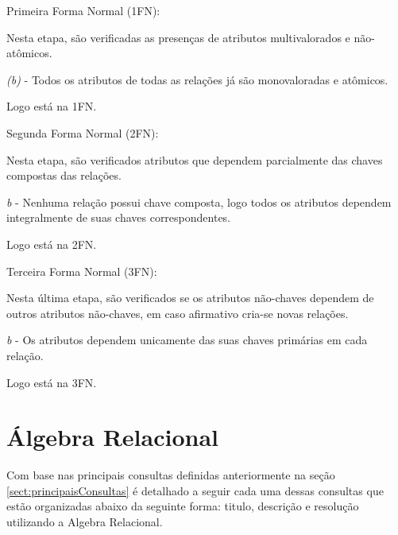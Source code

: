 \documentclass[12pt, onecolumn, titlepage]{article}
\begin{document}
\begin{description}

\item Primeira Forma Normal (1FN):

Nesta etapa, são verificadas as presenças de atributos multivalorados e não-atômicos.

\textit{(b)} - Todos os atributos de todas as relações já são monovaloradas e atômicos.

Logo está na 1FN.

\item Segunda Forma Normal (2FN):

Nesta etapa, são verificados atributos que dependem parcialmente das chaves compostas das relações.

\textit{b} - Nenhuma relação possui chave composta, logo todos os atributos dependem integralmente de suas chaves correspondentes.

Logo está na 2FN.

\item Terceira Forma Normal (3FN):

Nesta última etapa, são verificados se os atributos não-chaves dependem de outros atributos não-chaves, em caso afirmativo cria-se novas relações.

\textit{b} - Os atributos dependem unicamente das suas chaves primárias em cada relação.

Logo está na 3FN.
\end{description}

\newpage
\section{Álgebra Relacional}
\label{sect:algebra}

Com base nas principais consultas definidas anteriormente na seção \ref{sect:principaisConsultas} é detalhado a seguir cada uma dessas consultas que estão organizadas abaixo da seguinte forma: titulo, descrição e resolução utilizando a Algebra Relacional.\\
\end{document}
